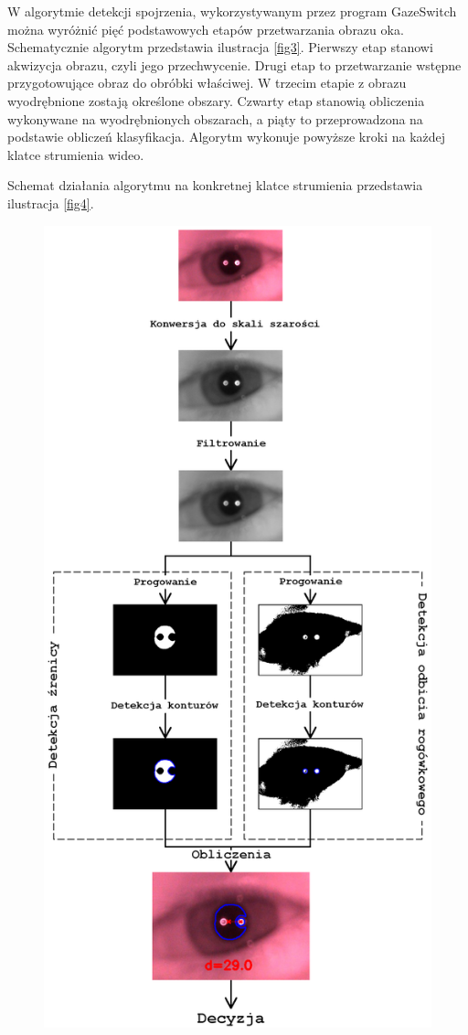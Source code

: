 W algorytmie detekcji spojrzenia, wykorzystywanym przez program GazeSwitch można wyróżnić pięć podstawowych etapów przetwarzania obrazu oka. Schematycznie algorytm przedstawia ilustracja \ref{fig3}. Pierwszy etap stanowi akwizycja obrazu, czyli jego przechwycenie. Drugi etap to przetwarzanie wstępne przygotowujące obraz do obróbki właściwej. W trzecim etapie z obrazu wyodrębnione zostają określone obszary. Czwarty etap stanowią obliczenia wykonywane na wyodrębnionych obszarach, a piąty to przeprowadzona na podstawie obliczeń klasyfikacja. Algorytm wykonuje powyższe kroki na każdej klatce strumienia wideo.

Schemat działania algorytmu na konkretnej klatce strumienia przedstawia ilustracja \ref{fig4}.
\newpage
\restoregeometry
\begin{figure}[!h]
\centering
\includegraphics[scale=0.2]{images/4.png}

\end{figure}

